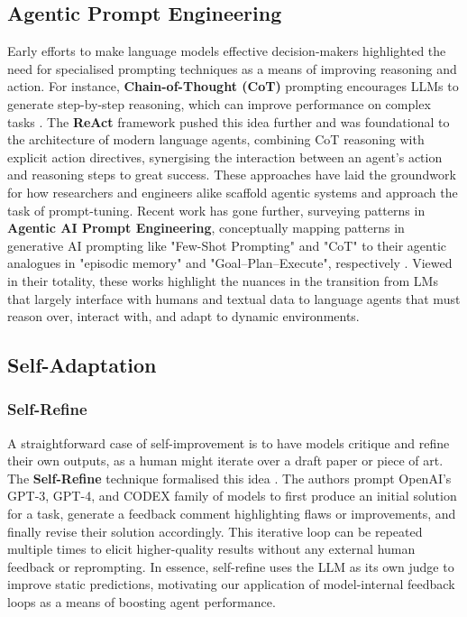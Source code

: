 \documentclass[11pt]{article}
\begin{document}
\subsection{Agentic Prompt Engineering}
Early efforts to make language models effective decision-makers highlighted the need for specialised prompting techniques as a means of improving reasoning and action. For instance, \textbf{Chain-of-Thought (CoT)} prompting encourages LLMs to generate step-by-step reasoning, which can improve performance on complex tasks \citep{wei2022cot}. The \textbf{ReAct} framework \citep{yao2022react} pushed this idea further and was foundational to the architecture of modern language agents, combining CoT reasoning with explicit action directives, synergising the interaction between an agent's action and reasoning steps to great success. These approaches have laid the groundwork for how researchers and engineers alike scaffold agentic systems and approach the task of prompt-tuning. Recent work has gone further, surveying patterns in \textbf{Agentic AI Prompt Engineering}, conceptually mapping patterns in generative AI prompting like "Few-Shot Prompting" and "CoT" to their agentic analogues in "episodic memory" and "Goal–Plan–Execute", respectively \citep{schneider2025}. Viewed in their totality, these works highlight the nuances in the transition from LMs that largely interface with humans and textual data to language agents that must reason over, interact with, and adapt to dynamic environments.

\subsection{Self-Adaptation}
\subsubsection{Self-Refine}
A straightforward case of self-improvement is to have models critique and refine their own outputs, as a human might iterate over a draft paper or piece of art. The \textbf{Self-Refine} technique formalised this idea \citep{madaan2023selfrefine}. The authors prompt OpenAI's GPT-3, GPT-4, and CODEX family of models to first produce an initial solution for a task, generate a feedback comment highlighting flaws or improvements, and finally revise their solution accordingly. This iterative loop can be repeated multiple times to elicit higher-quality results without any external human feedback or reprompting. In essence, self-refine uses the LLM as its own judge to improve static predictions, motivating our application of model-internal feedback loops as a means of boosting agent performance.
\end{document}
